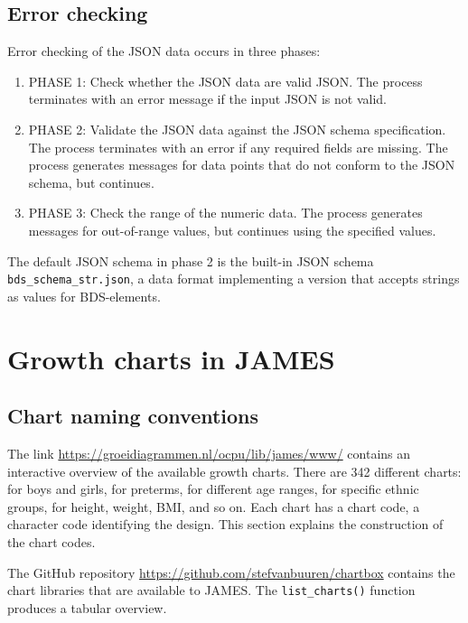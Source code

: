 \documentclass[]{book}
\begin{document}
\hypertarget{error-checking}{%
\section{Error checking}\label{error-checking}}

Error checking of the JSON data occurs in three phases:

\begin{enumerate}
\def\labelenumi{\arabic{enumi}.}
\item
  PHASE 1: Check whether the JSON data are valid JSON. The process terminates
  with an error message if the input JSON is not valid.
\item
  PHASE 2: Validate the JSON data against the JSON schema specification. The process terminates
  with an error if any required fields are missing. The process generates messages for data points
  that do not conform to the JSON schema, but continues.
\item
  PHASE 3: Check the range of the numeric data. The process generates messages for out-of-range
  values, but continues using the specified values.
\end{enumerate}

The default JSON schema in phase 2 is the built-in JSON schema \texttt{bds\_schema\_str.json}, a data format implementing a version that accepts strings as values for BDS-elements.

\hypertarget{growth-charts-in-james}{%
\chapter{Growth charts in JAMES}\label{growth-charts-in-james}}

\hypertarget{chart-naming-conventions}{%
\section{Chart naming conventions}\label{chart-naming-conventions}}

The link \url{https://groeidiagrammen.nl/ocpu/lib/james/www/} contains an interactive overview of the available growth charts. There are 342 different charts: for boys and girls, for preterms, for different age ranges, for specific ethnic groups, for height, weight, BMI, and so on. Each chart has a chart code, a character code identifying the design. This section explains the construction of the chart codes.

The GitHub repository \url{https://github.com/stefvanbuuren/chartbox} contains the chart libraries that are available to JAMES. The \texttt{list\_charts()} function produces a tabular overview.
\end{document}
